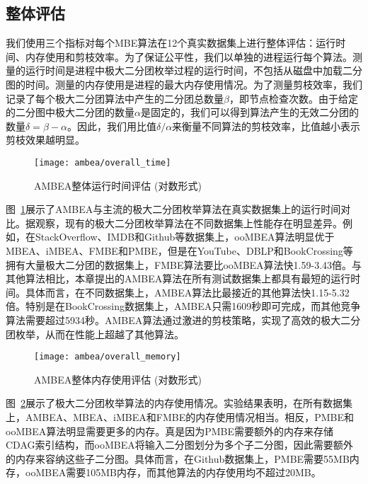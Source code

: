 \subsection{整体评估}
\label{subsec:ambea_exp_overall}

我们使用三个指标对每个MBE算法在12个真实数据集上进行整体评估：运行时间、内存使用和剪枝效率。为了保证公平性，我们以单独的进程运行每个算法。测量的运行时间是进程中极大二分团枚举过程的运行时间，不包括从磁盘中加载二分图的时间。测量的内存使用是进程的最大内存使用情况。为了测量剪枝效率，我们记录了每个极大二分团算法中产生的二分团总数量$\beta$，即节点检查次数。由于给定的二分图中极大二分团的数量$\alpha$是固定的，我们可以得到算法产生的无效二分团的数量$\delta=\beta-\alpha$。因此，我们用比值$\delta/\alpha$来衡量不同算法的剪枝效率，比值越小表示剪枝效果越明显。

\begin{figure} [H]
  \centering
  \texttt{[image: ambea/overall\_time]}
  \caption{AMBEA整体运行时间评估 (对数形式)}
  \label{fig:ambea_overall_time}
\end{figure}

图~\ref{fig:ambea_overall_time}展示了AMBEA与主流的极大二分团枚举算法在真实数据集上的运行时间对比。据观察，现有的极大二分团枚举算法在不同数据集上性能存在明显差异。例如，在StackOverflow、IMDB和Github等数据集上，ooMBEA算法明显优于MBEA、iMBEA、FMBE和PMBE，但是在YouTube、DBLP和BookCrossing等拥有大量极大二分团的数据集上，FMBE算法要比ooMBEA算法快1.59-3.43倍。与其他算法相比，本章提出的AMBEA算法在所有测试数据集上都具有最短的运行时间。具体而言，在不同数据集上，AMBEA算法比最接近的其他算法快1.15-5.32倍。特别是在BookCrossing数据集上，AMBEA只需1609秒即可完成，而其他竞争算法需要超过5934秒。AMBEA算法通过激进的剪枝策略，实现了高效的极大二分团枚举，从而在性能上超越了其他算法。

\begin{figure} [H]
  \centering
  \texttt{[image: ambea/overall\_memory]}
  \caption{AMBEA整体内存使用评估 (对数形式)}
  \label{fig:ambea_overall_memory}
\end{figure}

图~\ref{fig:ambea_overall_memory}展示了极大二分团枚举算法的内存使用情况。实验结果表明，在所有数据集上，AMBEA、MBEA、iMBEA和FMBE的内存使用情况相当。相反，PMBE和ooMBEA算法明显需要更多的内存。真是因为PMBE需要额外的内存来存储CDAG索引结构，而ooMBEA将输入二分图划分为多个子二分图，因此需要额外的内存来容纳这些子二分图。具体而言，在Github数据集上，PMBE需要55MB内存，ooMBEA需要105MB内存，而其他算法的内存使用均不超过20MB。

